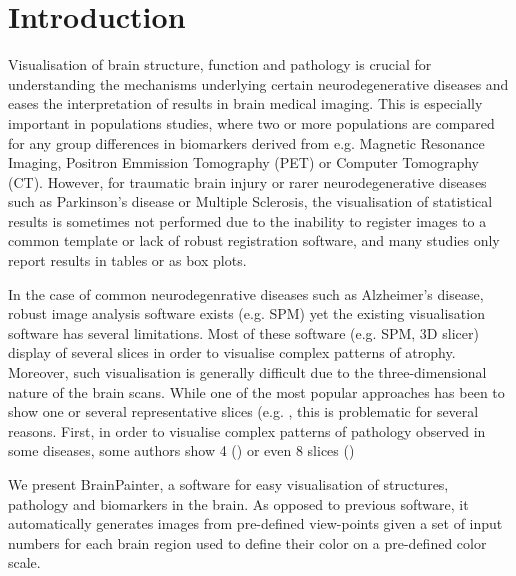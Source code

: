 \documentclass[final,5p,times,twocolumn,authoryear]{elsarticle}
\begin{document}

\FloatBarrier
\section{Introduction}
\label{intro}


Visualisation of brain structure, function and pathology is crucial for understanding the mechanisms underlying certain neurodegenerative diseases and eases the interpretation of results in brain medical imaging. This is especially important in populations studies, where two or more populations are compared for any group differences in biomarkers derived from e.g. Magnetic Resonance Imaging, Positron Emmission Tomography (PET) or Computer Tomography (CT). However, for traumatic brain injury or rarer neurodegenerative diseases such as Parkinson's disease or Multiple Sclerosis, the visualisation of statistical results is sometimes not performed due to the inability to register images to a common template or lack of robust registration software, and many studies  \cite{coughlin2015neuroinflammation,mak2014subcortical,schoonheim2012subcortical,chard2002brain} only report results in tables or as box plots. 

In the case of common neurodegenrative diseases such as Alzheimer's disease, robust image analysis software exists (e.g. SPM) yet the existing visualisation software has several limitations. Most of these software (e.g. SPM, 3D slicer) display of several slices in order to visualise complex patterns of atrophy. Moreover, such visualisation is generally difficult due to the three-dimensional nature of the brain scans. While one of the most popular approaches has been to show one or several representative slices (e.g. \cite{seeley2009neurodegenerative,scahill2002mapping,}, this is problematic for several reasons. First, in order to visualise complex patterns of pathology observed in some diseases, some authors show 4 (\cite{seeley2009neurodegenerative}) or even 8 slices (\cite{migliaccio2015mapping})



We present BrainPainter, a software for easy visualisation of structures, pathology and biomarkers in the brain. As opposed to previous software, it automatically generates images from pre-defined view-points given a set of input numbers for each brain region used to define their color on a pre-defined color scale.  
\end{document}
